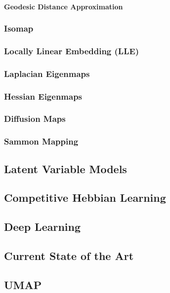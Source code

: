 \paragraph{Geodesic Distance Approximation}

\subsubsection{Isomap}

\subsubsection{Locally Linear Embedding (LLE)}

\subsubsection{Laplacian Eigenmaps}

\subsubsection{Hessian Eigenmaps}

\subsubsection{Diffusion Maps}

\subsubsection{Sammon Mapping}

\subsection{Latent Variable Models}

\subsection{Competitive Hebbian Learning}

\subsection{Deep Learning}

\subsection{Current State of the Art}
\subsection{UMAP}


